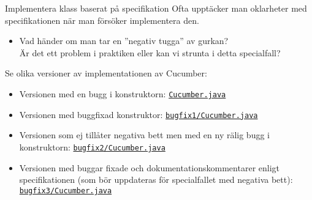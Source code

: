 \documentclass{lecturenotes}
\begin{document}
\begin{Slide}{Implementera klass baserat på specifikation} \footnotesize
Ofta upptäcker man oklarheter med specifikationen när man försöker implementera den.
\begin{itemize}
\item Vad händer om man tar en ''negativ tugga'' av gurkan? \\
Är det ett problem i praktiken eller kan vi strunta i detta specialfall?
\end{itemize}
Se olika versioner av implementationen av Cucumber:
\begin{itemize}
\item Versionen med en bugg i konstruktorn: \href{https://github.com/bjornregnell/lth-eda016-2015/blob/master/lectures/examples/terminal/constructor/Cucumber.java}{\texttt{Cucumber.java}}
\item Versionen med buggfixad konstruktor: \href{https://github.com/bjornregnell/lth-eda016-2015/blob/master/lectures/examples/terminal/constructor/bugfix1/Cucumber.java}{\texttt{bugfix1/Cucumber.java}}
\item Versionen som ej tillåter negativa bett men med en ny rälig bugg i konstruktorn: \href{https://github.com/bjornregnell/lth-eda016-2015/blob/master/lectures/examples/terminal/constructor/bugfix2/Cucumber.java}{\texttt{bugfix2/Cucumber.java}}
\item Versionen med buggar fixade och dokumentationskommentarer enligt specifikationen (som bör uppdateras för specialfallet med negativa bett): \href{https://github.com/bjornregnell/lth-eda016-2015/blob/master/lectures/examples/terminal/constructor/bugfix3/Cucumber.java}{\texttt{bugfix3/Cucumber.java}}
\end{itemize}
\end{Slide}
\end{document}
